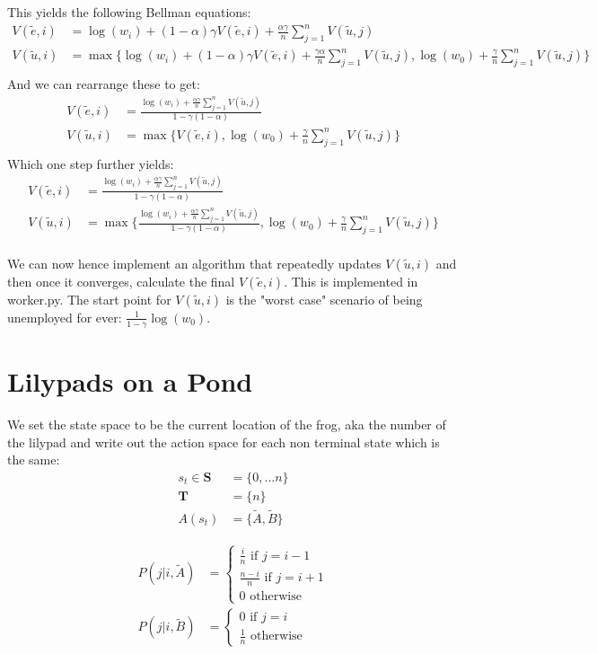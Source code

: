 \documentclass{article}[12pt]
\begin{document}
This yields the following Bellman equations:
\begin{align*}
V(\tilde{e}, i) &= \log(w_i) + (1-\alpha)\gamma V(\tilde{e},i) + \frac{\alpha\gamma}{n} \sum_{j=1}^n V(\tilde{u}, j)\\
V(\tilde{u}, i) &= \max\{\log(w_i) + (1-\alpha)\gamma V(\tilde{e},i) + \frac{\gamma\alpha}{n} \sum_{j=1}^n V(\tilde{u}, j), \log(w_0)+ \frac{\gamma}{n} \sum_{j=1}^n V(\tilde{u}, j)\}\\
\end{align*}
And we can rearrange these to get:
\begin{align*}
V(\tilde{e}, i) &= \frac{\log(w_i) + \frac{\alpha\gamma}{n} \sum_{j=1}^n V(\tilde{u}, j)}{1-\gamma(1-\alpha)}\\
V(\tilde{u}, i)& =  \max\{V(\tilde{e},i), \log(w_0)+ \frac{\gamma}{n} \sum_{j=1}^n V(\tilde{u}, j)\} \\
\end{align*}
Which one step further yields:
\begin{align*}
V(\tilde{e}, i) &= \frac{\log(w_i) + \frac{\alpha\gamma}{n} \sum_{j=1}^n V(\tilde{u}, j)}{1-\gamma(1-\alpha)}\\
V(\tilde{u}, i)& =  \max\{ \frac{\log(w_i) + \frac{\alpha\gamma}{n} \sum_{j=1}^n V(\tilde{u}, j)}{1-\gamma(1-\alpha)}, \log(w_0)+ \frac{\gamma}{n} \sum_{j=1}^n V(\tilde{u}, j)\} \\
\end{align*}

We can now hence implement an algorithm that repeatedly updates $V(\tilde{u}, i)$ and then once it converges, calculate the final $V(\tilde{e}, i)$. This is implemented in worker.py. The start point for $V(\tilde{u}, i)$ is the "worst case" scenario of being unemployed for ever: $\frac{1}{1-\gamma}{\log(w_0)}$.


\section{Lilypads on a Pond}
We set the state space to be the current location of the frog, aka the number of the lilypad and write out the action space for each non terminal state which is the same:
\begin{align*}
s_t \in \mathbf{S}& =\{0,\ldots n\}\\
\mathbf{T}& = \{n\}\\
A(s_t) &= \{\tilde{A},\tilde{B}\}
\end{align*} 

\begin{align*}
P(j | i, \tilde{A}) &=  \begin{cases} \frac{i}{n} \text{ if $j=i-1$}\\ \frac{n-i}{n} \text{ if $j=i+1$} \\ 0 \text{  otherwise} \end{cases}\\
P(j | i, \tilde{B}) &=  \begin{cases} 0 \text{ if $j=i$}\\ \frac{1}{n} \text{  otherwise} \end{cases}\\
\end{align*} 
\end{document}
